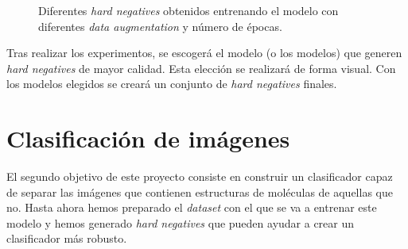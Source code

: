 \begin{figure}[H]
\centering
    \caption{Diferentes \textit{hard negatives} obtenidos entrenando el modelo con diferentes \textit{data augmentation} y número de épocas.} 
\end{figure}
    
Tras realizar los experimentos, se escogerá el modelo (o los modelos) que generen \textit{hard negatives} de mayor calidad. Esta elección se realizará de forma visual. Con los modelos elegidos se creará un conjunto de \textit{hard negatives} finales.

\newpage
\section{Clasificación de imágenes}
El segundo objetivo de este proyecto consiste en construir un clasificador capaz de separar las imágenes que contienen estructuras de moléculas de aquellas que no. Hasta ahora hemos preparado el \textit{dataset} con el que se va a entrenar este modelo y hemos generado \textit{hard negatives} que pueden ayudar a crear un clasificador más robusto.

